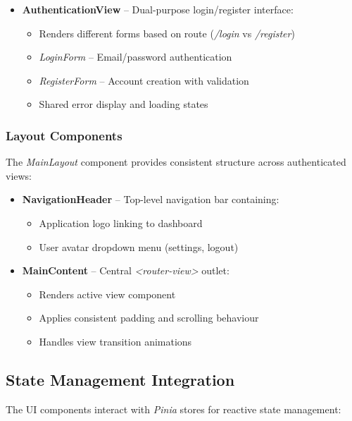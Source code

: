 \begin{itemize}
    \item \textbf{AuthenticationView} – Dual-purpose login/register interface:
    \begin{itemize}
        \item Renders different forms based on route (\textit{/login} vs \textit{/register})
        \item \textit{LoginForm} – Email/password authentication
        \item \textit{RegisterForm} – Account creation with validation
        \item Shared error display and loading states
    \end{itemize}
\end{itemize}

\subsubsection*{Layout Components}

The \textit{MainLayout} component provides consistent structure across authenticated views:

\begin{itemize}
    \item \textbf{NavigationHeader} – Top-level navigation bar containing:
    \begin{itemize}
        \item Application logo linking to dashboard
        \item User avatar dropdown menu (settings, logout)
    \end{itemize}
    
    \item \textbf{MainContent} – Central \textit{<router-view>} outlet:
    \begin{itemize}
        \item Renders active view component
        \item Applies consistent padding and scrolling behaviour
        \item Handles view transition animations
    \end{itemize}
    
\end{itemize}

\subsection{State Management Integration}

The UI components interact with \textit{Pinia} stores for reactive state management:

